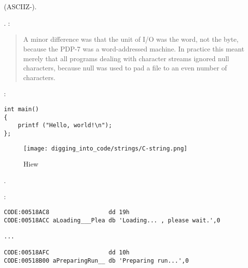 \section{}

\label{C_strings}
(\ac{ASCIIZ}-).

.
 \cite{Ritchie79} :

\begin{framed}
\begin{quotation}
A minor difference was that the unit of I/O was the word, not the byte, because the PDP-7 was a word-addressed
machine. In practice this meant merely that all programs dealing with character streams ignored null
characters, because null was used to pad a file to an even number of characters.
\end{quotation}
\end{framed}

:

\begin{lstlisting}
int main()
{
	printf ("Hello, world!\n");
};
\end{lstlisting}

\begin{figure}[H]
\centering
\texttt{[image: digging\_into\_code/strings/C-string.png]}
\caption{Hiew}
\end{figure}

.

:

\begin{lstlisting}[caption=Delphi]
CODE:00518AC8                 dd 19h
CODE:00518ACC aLoading___Plea db 'Loading... , please wait.',0

...

CODE:00518AFC                 dd 10h
CODE:00518B00 aPreparingRun__ db 'Preparing run...',0
\end{lstlisting}

